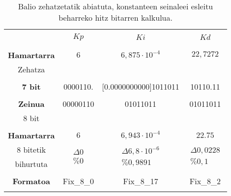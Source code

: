 %


\begin{table}[!htp]
\centering
\begin{tabular}[c]{c||c|c|c}
 & & & \\
 & {\Large$Kp$} & {\Large$Ki$} & {\Large$Kd$} \\
 & & & \\
\hline
\hline
 & & & \\
\textbf{Hamartarra} & $6$ & $6,875\cdot 10^{-4}$ & $22,7272$ \\
\small{Zehatza} & & & \\
 & & & \\
\textbf{7 bit} & 0000110. & {\tiny[0.0000000000]}1011011 & 10110.11 \\
 & & & \\
\textbf{Zeinua} & 00000110 & 01011011 & 01011011 \\
\small{8 bit} & & & \\
 & & & \\
\textbf{Hamartarra} & $6$ & $6,943 \cdot 10^{-4}$ & $22.75$ \\
\small{8 bitetik} &
 \multirow{2}{*}{\footnotesize $\begin{matrix}\Delta0\\\%0\end{matrix}$} &
 \multirow{2}{*}{\footnotesize $\begin{matrix}\Delta6,8\cdot 10^{-6}\\\%0,9891\end{matrix}$} &
 \multirow{2}{*}{\footnotesize $\begin{matrix}\Delta0,0228\\\%0,1\end{matrix}$} \\
\small{bihurtuta} & & & \\
 & & & \\
\textbf{Formatoa} & Fix\_8\_0 & Fix\_8\_17 & Fix\_8\_2 \\
 & & & \\
\end{tabular}
\caption[Konstanteei esleitu beharreko hitz bitarrak kalkulatzea]{Balio zehatzetatik abiatuta, konstanteen seinaleei esleitu beharreko hitz bitarren kalkulua.}
\label{tab:vhdl_coef}
\end{table}

